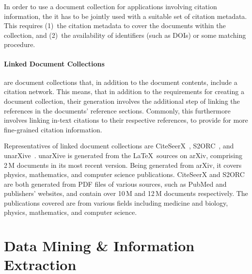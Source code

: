 In order to use a document collection for applications involving citation information, the it has to be jointly used with a suitable set of citation metadata. This requires (1)~the citation metadata to cover the documents within the collection, and (2)~the availability of identifiers (such as DOIs) or some matching procedure.  %

\paragraph{Linked Document Collections}
are document collections that, in addition to the document contents, include a citation network. This means, that in addition to the requirements for creating a document collection, their generation involves the additional step of linking the references in the documents' reference sections. Commonly, this furthermore involves linking in-text citations to their respective references, to provide for more fine-grained citation information.

Representatives of linked document collections are CiteSeerX~\cite{Wu2015,Wu2016,Patel2021},  %
S2ORC~\cite{Lo2020}, and unarXive~\cite{Saier2020}. unarXive is generated from the \LaTeX\ sources on arXiv, comprising 2\,M documents in its most recent version. Being generated from arXiv, it covers physics, mathematics, and computer science publications. CiteSeerX and S2ORC are both generated from PDF files of various sources, such as PubMed and publishers' websites, and contain over 10\,M and 12\,M documents respectively. The publications covered are from various fields including medicine and biology, physics, mathematics, and computer science.


\section{Data Mining \& Information Extraction}

